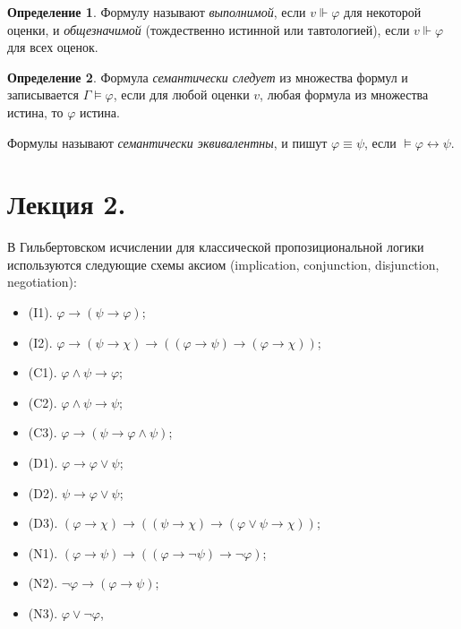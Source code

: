 \documentclass[a4paper,100pt]{article}
\theoremstyle{indented}
\theoremstyle{definition}
\newtheorem{defn}{Определение}
\theoremstyle{remark}
\begin{document}
\begin{defn}
  Формулу называют \textit{выполнимой}, если $v \Vdash \varphi$ для некоторой оценки, и \textit{общезначимой} (тождественно истинной или тавтологией), если $v \Vdash \varphi$ для всех оценок.
\end{defn}

\begin{defn}
  Формула \textit{семантически следует} из множества формул и записывается $\Gamma \vDash \varphi$, если для любой оценки $v$, любая формула из множества истина, то $\varphi$ истина.  \ 
  
  Формулы называют \textit{семантически эквивалентны}, и пишут $\varphi \equiv \psi$, если $\vDash \varphi \leftrightarrow \psi$. 
\end{defn}


\section{Лекция 2.}

В Гильбертовском исчислении для классической пропозициональной логики используются следующие схемы аксиом (implication, conjunction, disjunction, negotiation): 

\begin{itemize}
  \item (I1). $\varphi\rightarrow (\psi\rightarrow \varphi)$;
  \item (I2). $\varphi\rightarrow (\psi\rightarrow \chi)\rightarrow((\varphi\rightarrow \psi)\rightarrow (\varphi\rightarrow \chi))$; 
  \item (C1). $\varphi \wedge \psi \rightarrow \varphi$; 
  \item (C2). $\varphi \wedge \psi \rightarrow \psi$; 
  \item (C3). $\varphi\rightarrow (\psi \rightarrow \varphi \wedge \psi)$;
  \item (D1). $\varphi\rightarrow \varphi \vee\psi$;
  \item (D2). $\psi\rightarrow \varphi \vee \psi$; 
  \item (D3). $(\varphi\rightarrow \chi)\rightarrow((\psi\rightarrow \chi)\rightarrow (\varphi\vee\psi\rightarrow\chi))$;
  \item (N1). $(\varphi\rightarrow \psi)\rightarrow((\varphi\rightarrow \neg \psi)\rightarrow \neg \varphi)$; 
  \item (N2). $\neg\varphi \rightarrow (\varphi\rightarrow \psi)$; 
  \item (N3). $\varphi \vee \neg \varphi$, 
\end{itemize}
\end{document}
